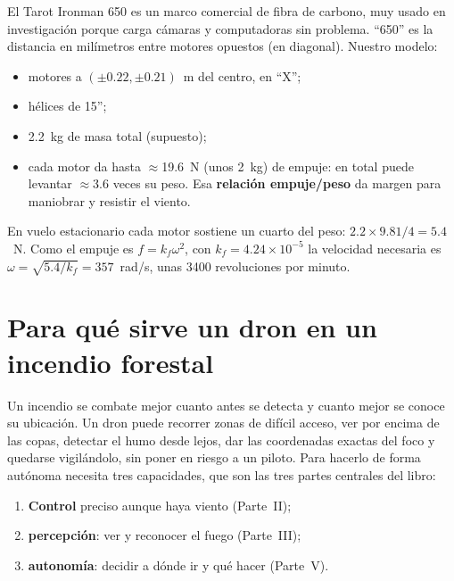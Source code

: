 El Tarot Ironman 650 es un marco comercial de fibra de carbono, muy usado en investigación porque
carga cámaras y computadoras sin problema. ``650'' es la distancia en milímetros entre motores
opuestos (en diagonal). Nuestro modelo:
\begin{itemize}
  \item motores a $(\pm0.22, \pm0.21)$~m del centro, en ``X'';
  \item hélices de 15'';
  \item 2.2~kg de masa total (supuesto);
  \item cada motor da hasta $\approx$19.6~N (unos 2~kg) de empuje: en total puede levantar
        $\approx$3.6 veces su peso. Esa \textbf{relación empuje/peso} da margen para maniobrar y
        resistir el viento.
\end{itemize}

\begin{tecnico}
En vuelo estacionario cada motor sostiene un cuarto del peso: $2.2\times9.81/4 = 5.4$~N. Como el
empuje es $f = k_f\omega^2$, con $k_f = 4.24\times10^{-5}$ la velocidad necesaria es
$\omega = \sqrt{5.4/k_f} = 357$~rad/s, unas 3400 revoluciones por minuto.
\end{tecnico}

\section{Para qué sirve un dron en un incendio forestal}

Un incendio se combate mejor cuanto antes se detecta y cuanto mejor se conoce su ubicación. Un dron
puede recorrer zonas de difícil acceso, ver por encima de las copas, detectar el humo desde lejos,
dar las coordenadas exactas del foco y quedarse vigilándolo, sin poner en riesgo a un piloto. Para
hacerlo de forma autónoma necesita tres capacidades, que son las tres partes centrales del libro:
\begin{enumerate}
  \item \textbf{Control} preciso aunque haya viento (Parte~II);
  \item \textbf{percepción}: ver y reconocer el fuego (Parte~III);
  \item \textbf{autonomía}: decidir a dónde ir y qué hacer (Parte~V).
\end{enumerate}
